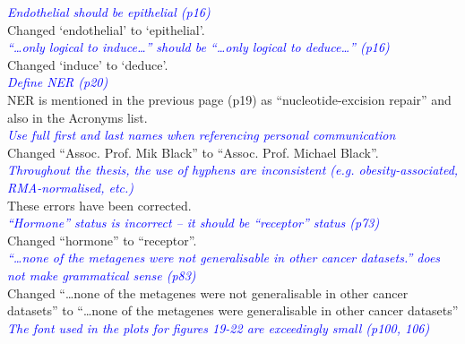 \documentclass[a4paper, 12pt]{article}
\begin{document}
\noindent
\textcolor{blue}{
\textit{Endothelial should be epithelial (p16)
}
}\\

\noindent
Changed `endothelial' to `epithelial'.
\\

\noindent
\textcolor{blue}{
\textit{``\ldots only logical to induce\ldots'' should be ``\ldots only logical to deduce\ldots'' (p16)
}
}\\

\noindent
Changed `induce' to `deduce'.
\\

\noindent
\textcolor{blue}{
\textit{Define NER (p20)
}
}\\

\noindent
NER is mentioned in the previous page (p19) as ``nucleotide-excision repair'' and also in the Acronyms list.
\\

\noindent
\textcolor{blue}{
\textit{Use full first and last names when referencing personal communication
}
}\\

\noindent
Changed ``Assoc. Prof. Mik Black'' to ``Assoc. Prof. Michael Black''.
\\

\noindent
\textcolor{blue}{
\textit{Throughout the thesis, the use of hyphens are inconsistent (e.g. obesity-associated, RMA-normalised, etc.)
}
}\\

\noindent
These errors have been corrected.
\\

\noindent
\textcolor{blue}{
\textit{``Hormone'' status is incorrect -- it should be ``receptor'' status (p73)
}
}\\

\noindent
Changed ``hormone'' to ``receptor''.
\\

\noindent
\textcolor{blue}{
\textit{``\ldots none of the metagenes were not generalisable in other cancer datasets.'' does not make grammatical sense (p83)
}
}\\

\noindent
Changed ``\ldots none of the metagenes were not generalisable in other cancer datasets'' to ``\ldots none of the metagenes were generalisable in other cancer datasets''
\\

\noindent
\textcolor{blue}{
\textit{The font used in the plots for figures 19-22 are exceedingly small (p100, 106)
}
}\\
\end{document}
